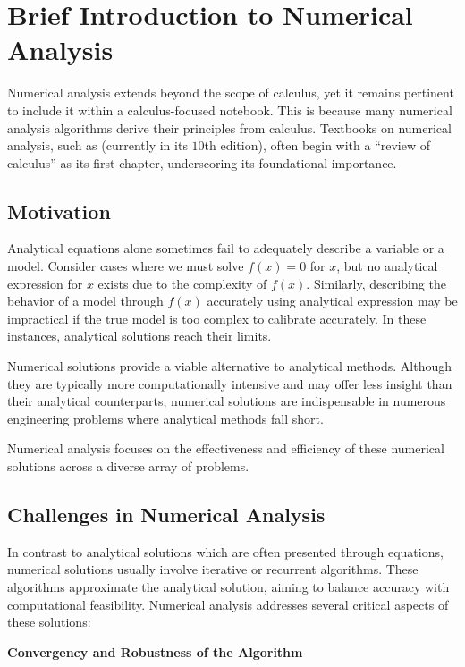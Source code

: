 \chapter{Brief Introduction to Numerical Analysis}

Numerical analysis extends beyond the scope of calculus, yet it remains pertinent to include it within a calculus-focused notebook. This is because many numerical analysis algorithms derive their principles from calculus. Textbooks on numerical analysis, such as \cite{burden1997numerical} (currently in its $10$th edition), often begin with a ``review of calculus'' as its first chapter, underscoring its foundational importance.

\section{Motivation}

Analytical equations alone sometimes fail to adequately describe a variable or a model. Consider cases where we must solve $f(x) = 0$ for $x$, but no analytical expression for $x$ exists due to the complexity of $f(x)$. Similarly, describing the behavior of a model through $f(x)$ accurately using analytical expression may be impractical if the true model is too complex to calibrate accurately. In these instances, analytical solutions reach their limits.

Numerical solutions provide a viable alternative to analytical methods. Although they are typically more computationally intensive and may offer less insight than their analytical counterparts, numerical solutions are indispensable in numerous engineering problems where analytical methods fall short.

Numerical analysis focuses on the effectiveness and efficiency of these numerical solutions across a diverse array of problems.

\section{Challenges in Numerical Analysis}

In contrast to analytical solutions which are often presented through equations, numerical solutions usually involve iterative or recurrent algorithms. These algorithms approximate the analytical solution, aiming to balance accuracy with computational feasibility. Numerical analysis addresses several critical aspects of these solutions:

\vspace{0.1in}
\noindent \textbf{Convergency and Robustness of the Algorithm}
\vspace{0.1in}

